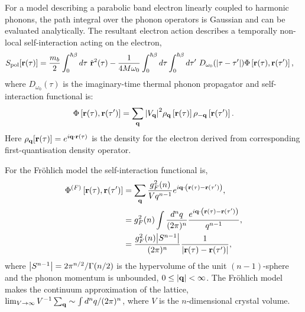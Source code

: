 For a model describing a parabolic band electron linearly coupled to harmonic phonons, the path integral over the phonon operators is Gaussian and can be evaluated analytically. The resultant electron action describes a temporally non-local self-interaction acting on the electron,
\begin{equation} \label{eqn:eph-action}
    \begin{aligned}
        S_{\text{pol}}[\vb{r}(\tau)] &= \frac{m_b}{2} \int_0^{\hbar\beta} d\tau\ \Dot{\vb{r}}^2(\tau) - \frac{1}{4 M \omega_0} \int_0^{\hbar\beta} d\tau \int_0^{\hbar\beta} d\tau'\ D_{\omega_0}(\abs{\tau - \tau'}) \Phi\left[\vb{r}(\tau), \vb{r}(\tau')\right] ,
    \end{aligned}
\end{equation}
where $ D_{\omega_0}(\tau)$ is the imaginary-time thermal phonon propagator and self-interaction functional is:
\begin{equation}
    \Phi\left[\vb{r}(\tau), \vb{r}(\tau')\right] = \sum_{\vb{q}} \abs{V_{\vb{q}}}^2 \rho_{\vb{q}} \left[\vb{r}(\tau)\right] \rho_{\vb{-q}}\left[\vb{r}(\tau')\right].
\end{equation}
Here $\rho_{\vb{q}}[\vb{r}(\tau)] = e^{i \vb{q} \cdot \vb{r}(\tau)}$ is the density for the electron derived from corresponding first-quantisation density operator.
\newline

For the Fr\"ohlich model the self-interaction functional is,
\begin{equation}
    \begin{aligned}
        \Phi^{(F)}\left[\vb{r}(\tau), \vb{r}(\tau')\right] &= \sum_{\vb{q}} \frac{g_{F}^2(n)}{V q^{n-1}} e^{i \vb{q} \cdot \left(\vb{r}(\tau) - \vb{r}(\tau') \right)} , \\
        &= g_{F}^2(n) \int \frac{d^n q}{(2\pi)^n} \frac{e^{i\vb{q}\cdot\left(\vb{r}(\tau) - \vb{r}(\tau')\right)}}{q^{n-1}} , \\
        &= \frac{g^2_F(n) \abs{S^{n-1}}}{(2\pi)^{n}} \frac{1}{\abs{\vb{r}(\tau) - \vb{r}(\tau')}} ,
    \end{aligned}
\end{equation}
where $\abs{S^{n-1}} = 2\pi^{n/2}/\Gamma(n/2)$ is the hypervolume of the unit $(n-1)$-sphere and the phonon momentum is unbounded, $0 \leq \abs{\vb{q}} < \infty$. The Fr\"ohlich model makes the continuum approximation of the lattice, $\lim_{V \to \infty} V^{-1}\sum_{\vb{q}} \sim \int d^nq / (2\pi)^n$, where $V$ is the $n$-dimensional crystal volume.
\newline

